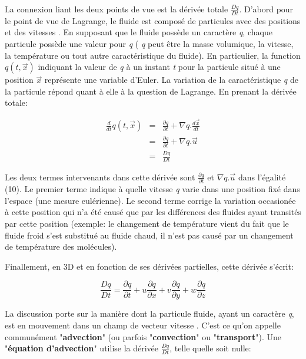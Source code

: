 \documentclass[11pt]{report}
\begin{document}
La connexion liant les deux points de vue est la dérivée totale $ \frac{Dq}{Dt} $. D'abord pour le point de vue de Lagrange, le fluide est composé de particules avec des positions  et des vitesses . En supposant que le fluide possède un caractère \textit{q}, chaque particule possède une valeur pour \textit{q} ( \textit{q} peut être la masse volumique, la vitesse, la température ou tout autre caractéristique du fluide). En particulier, la function $ q(t,\overrightarrow{x}) $ indiquant la valeur de \textit{q} à un instant \textit{t} pour la particule situé à une position $ \overrightarrow{x} $ représente une variable d'Euler. La variation de la caractéristique \textit{q}  de la particule répond quant à elle à la question de Lagrange. En prenant la dérivée totale:

\begin{eqnarray}
\frac{d}{dt} q(t, \overrightarrow{x}) 
& = & \frac{\partial q}{\partial t} + \nabla q. \frac{d\overrightarrow{x}}{dt} \\
& = & \frac{\partial q}{\partial t} + \nabla q. \overrightarrow{u} \\
& = & \frac{Dq}{Dt}
\end{eqnarray}

Les deux termes intervenants dans cette dérivée sont $ \frac{\partial q}{\partial t} $ et  $ \nabla q. \overrightarrow{u} $ dans l'égalité (10). Le premier terme indique à quelle vitesse \textit{q} varie dans une position fixé dans l'espace (une mesure eulérienne). Le second terme corrige la variation occasionée à cette position qui n'a été causé que par les différences des fluides ayant transités par cette position (exemple: le changement de température vient du fait que le fluide froid s'est substitué au fluide chaud, il n'est pas causé par un changement de température des molécules).

Finallement, en 3D et en fonction de ses dérivées partielles, cette dérivée s'écrit:

\begin{equation}
\frac{Dq}{Dt} 
 =  \frac{\partial q}{\partial t} + u \frac{\partial q}{\partial x} + v \frac{\partial q}{\partial y} + w \frac{\partial q}{\partial z}
\end{equation}
 
La discussion porte sur la manière dont la particule fluide, ayant un caractère \textit{q}, est en mouvement dans un champ de vecteur vitesse . C'est ce qu'on appelle communément "\textbf{advection}" (ou parfois "\textbf{convection}" ou "\textbf{transport}"). Une "\textbf{équation d'advection}" utilise la dérivée $ \frac{Dq}{Dt} $, telle quelle soit nulle:
\end{document}
